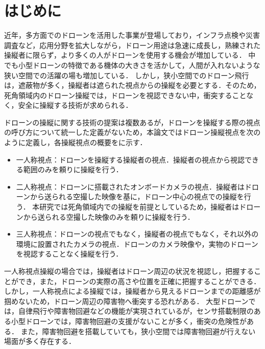 \documentclass[submit, sigrecommended]{ipsj}
\begin{document}
\section{はじめに}
\label{sec:Introduction}
近年，多方面でのドローンを活用した事業が登場しており，インフラ点検や災害調査など，応用分野を拡大しながら，ドローン用途は急速に成長し，熟練された操縦者に限らず，より多くの人がドローンを使用する機会が増加している\cite{article-drone01}\cite{article-drone02}．
中でも小型ドローンの特徴である機体の大きさを活かして，人間が入れないような狭い空間での活躍の場も増加している\cite{article-drone04}\cite{article-drone05}．
しかし，狭小空間でのドローン飛行は，遮蔽物が多く，操縦者は遮られた視点からの操縦を必要とする\cite{article-drone03}．そのため，死角領域内のドローン操縦では，ドローンを視認できない中，衝突することなく，安全に操縦する技術が求められる．
\par
ドローンの操縦に関する技術の提案は複数あるが\cite{article-drone07}\cite{article-ar01}\cite{book-drone05}，ドローンを操縦する際の視点の呼び方について統一した定義がないため，本論文ではドローン操縦視点を次のように定義し，各操縦視点の概要をに示す．
\begin{itemize}
  \item 一人称視点\mbox{}：ドローンを操縦する操縦者の視点．操縦者の視点から視認できる範囲のみを頼りに操縦を行う．
  \item 二人称視点\mbox{}：ドローンに搭載されたオンボードカメラの視点．操縦者はドローンから送られる空撮した映像を基に，ドローン中心の視点での操縦を行う．
  本研究では死角領域内での操縦を前提としているため，操縦者はドローンから送られる空撮した映像のみを頼りに操縦を行う．
  \item 三人称視点\mbox{}：ドローンの視点でもなく，操縦者の視点でもなく，それ以外の環境に設置されたカメラの視点．ドローンのカメラ映像や，実物のドローンを視認することなく操縦を行う．
\end{itemize}
一人称視点操縦の場合では，操縦者はドローン周辺の状況を視認し，把握することができ，また，ドローンの実際の高さや位置を正確に把握することができる\cite{book-drone02}．
しかし，一人称視点による操縦では，操縦者から見えるドローンまでの距離感が掴めないため\cite{article-ar01}\cite{article-ar02}，ドローン周辺の障害物へ衝突する恐れがある．
大型ドローンでは，自律飛行や障害物回避などの機能が実現されているが，センサ搭載制限のある小型ドローンでは，障害物回避の支援がないことが多く，衝突の危険性がある．
また，障害物回避を搭載していても，狭小空間では障害物回避が行えない場面が多く存在する\cite{article-drone12}．
\par
\end{document}

